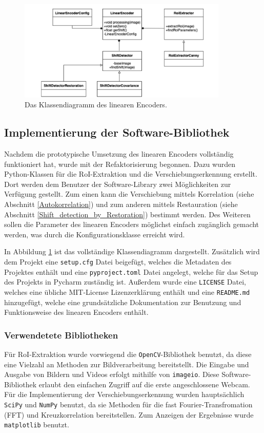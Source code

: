 \documentclass[10pt,a4paper]{scrarticle}
\begin{document}
\begin{figure}
\includegraphics[width=10cm]{Abbildungen/KlassendiagrammWhiteBackground.png}
  \centering
  \caption{Das Klassendiagramm des linearen Encoders.}
  \label{fig:Klassendiagramm}
\end{figure}

\subsection{Implementierung der Software-Bibliothek}
Nachdem die prototypische Umsetzung des linearen Encoders vollständig funktioniert hat, wurde mit der Refaktorisierung begonnen. Dazu wurden Python-Klassen für die RoI-Extraktion und die Verschiebungserkennung erstellt. Dort werden dem Benutzer der Software-Library zwei Möglichkeiten zur Verfügung gestellt. Zum einen kann die Verschiebung mittels Korrelation (siehe Abschnitt \ref{Autokorrelation}) und zum anderen mittels Restauration (siehe Abschnitt \ref{Shift_detection_by_Restoration}) bestimmt werden. Des Weiteren sollen die Parameter des linearen Encoders möglichst einfach zugänglich gemacht werden, was durch die Konfigurationsklasse erreicht wird. %

In Abbildung \ref{fig:Klassendiagramm} ist das vollständige Klassendiagramm dargestellt. Zusätzlich wird dem Projekt eine \texttt{setup.cfg} Datei beigefügt, welches die Metadaten des Projektes enthält und eine \texttt{pyproject.toml} Datei angelegt, welche für das Setup des Projekts in Pycharm zuständig ist. Außerdem wurde eine \texttt{LICENSE} Datei, welches eine übliche MIT-License Lizenzerklärung enthält und eine \texttt{README.md} hinzugefügt, welche eine grundsätzliche Dokumentation zur Benutzung und Funktionsweise des linearen Encoders enthält.

\subsubsection{Verwendetete Bibliotheken}
Für RoI-Extraktion wurde vorwiegend die \texttt{OpenCV}-Bibliothek benutzt, da diese eine Vielzahl an Methoden zur Bildverarbeitung bereitstellt. Die Eingabe und Ausgabe von Bildern und Videos erfolgt mithilfe von \texttt{imageio}. Diese Software-Bibliothek erlaubt den einfachen Zugriff auf die erste angeschlossene Webcam. Für die Implementierung der Verschiebungserkennung wurden hauptsächlich \texttt{SciPy} und \texttt{NumPy} benutzt, da sie Methoden für die fast Fourier-Transfromation (FFT) und Kreuzkorrelation bereitstellen. Zum Anzeigen der Ergebnisse wurde \texttt{matplotlib} benutzt.
\end{document}

